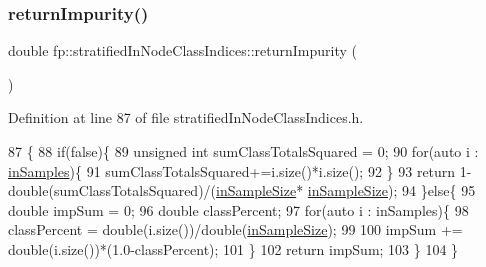 \subsubsection{\texorpdfstring{return\+Impurity()}{returnImpurity()}}
{\footnotesize\ttfamily double fp\+::stratified\+In\+Node\+Class\+Indices\+::return\+Impurity (\begin{DoxyParamCaption}{ }\end{DoxyParamCaption})\hspace{0.3cm}{\ttfamily [inline]}}



Definition at line 87 of file stratified\+In\+Node\+Class\+Indices.\+h.


\begin{DoxyCode}
87                                           \{
88                 \textcolor{keywordflow}{if}(\textcolor{keyword}{false})\{
89                     \textcolor{keywordtype}{unsigned} \textcolor{keywordtype}{int} sumClassTotalsSquared = 0;
90                     \textcolor{keywordflow}{for}(\textcolor{keyword}{auto} i : \hyperlink{classfp_1_1stratifiedInNodeClassIndices_a6bfa636c77b48163f5d245959ea753d0}{inSamples})\{
91                         sumClassTotalsSquared+=i.size()*i.size();
92                     \}
93                     \textcolor{keywordflow}{return} 1-double(sumClassTotalsSquared)/(\hyperlink{classfp_1_1stratifiedInNodeClassIndices_a2acb617e3212806ae7f994d925bd1468}{inSampleSize}*
      \hyperlink{classfp_1_1stratifiedInNodeClassIndices_a2acb617e3212806ae7f994d925bd1468}{inSampleSize});
94                 \}\textcolor{keywordflow}{else}\{
95                     \textcolor{keywordtype}{double} impSum = 0;
96                     \textcolor{keywordtype}{double} classPercent;
97                     \textcolor{keywordflow}{for}(\textcolor{keyword}{auto} i : inSamples)\{
98                         classPercent = double(i.size())/\textcolor{keywordtype}{double}(\hyperlink{classfp_1_1stratifiedInNodeClassIndices_a2acb617e3212806ae7f994d925bd1468}{inSampleSize});
99 
100                         impSum += double(i.size())*(1.0-classPercent);
101                     \}
102                     \textcolor{keywordflow}{return} impSum;
103                 \}
104             \}
\end{DoxyCode}
\mbox{\label{classfp_1_1stratifiedInNodeClassIndices_a2d7e802fb97db0367bb8e8f31d393afd}} 
